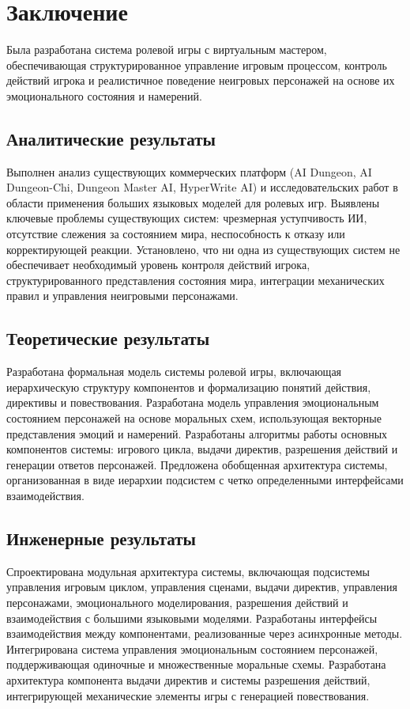 \chapter*{Заключение}
Была разработана система ролевой игры с виртуальным мастером, обеспечивающая структурированное управление игровым процессом, контроль действий игрока и реалистичное поведение неигровых персонажей на основе их эмоционального состояния и намерений.

\section*{Аналитические результаты}

Выполнен анализ существующих коммерческих платформ (AI Dungeon, AI Dungeon-Chi, Dungeon Master AI, HyperWrite AI) и исследовательских работ в области применения больших языковых моделей для ролевых игр. Выявлены ключевые проблемы существующих систем: чрезмерная уступчивость ИИ, отсутствие слежения за состоянием мира, неспособность к отказу или корректирующей реакции. Установлено, что ни одна из существующих систем не обеспечивает необходимый уровень контроля действий игрока, структурированного представления состояния мира, интеграции механических правил и управления неигровыми персонажами.

\section*{Теоретические результаты}

Разработана формальная модель системы ролевой игры, включающая иерархическую структуру компонентов и формализацию понятий действия, директивы и повествования. Разработана модель управления эмоциональным состоянием персонажей на основе моральных схем, использующая векторные представления эмоций и намерений. Разработаны алгоритмы работы основных компонентов системы: игрового цикла, выдачи директив, разрешения действий и генерации ответов персонажей. Предложена обобщенная архитектура системы, организованная в виде иерархии подсистем с четко определенными интерфейсами взаимодействия.

\section*{Инженерные результаты}

Спроектирована модульная архитектура системы, включающая подсистемы управления игровым циклом, управления сценами, выдачи директив, управления персонажами, эмоционального моделирования, разрешения действий и взаимодействия с большими языковыми моделями. Разработаны интерфейсы взаимодействия между компонентами, реализованные через асинхронные методы. Интегрирована система управления эмоциональным состоянием персонажей, поддерживающая одиночные и множественные моральные схемы. Разработана архитектура компонента выдачи директив и системы разрешения действий, интегрирующей механические элементы игры с генерацией повествования.

